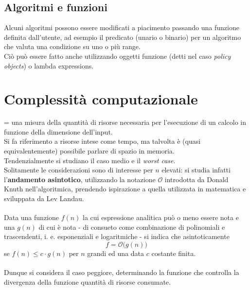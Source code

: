 \documentclass[10pt, oneside]{book}
\begin{document}
\subsection{Algoritmi e funzioni}
Alcuni algoritmi possono essere modificati a piacimento passando una funzione definita dall'utente, ad esempio il predicato (unario o binario) per un algoritmo che valuta una condizione su uno o più range.\\
Ciò può essere fatto anche utilizzando oggetti funzione (detti nel caso \textit{policy objects}) o lambda expressions.

\section{Complessità computazionale}
= una misura della quantità di risorse necessaria per l'esecuzione di un calcolo in funzione della dimensione dell'input.\\
Si fa riferimento a risorse intese come tempo, ma talvolta è (quasi equivalentemente) possibile parlare di spazio in memoria.\\
Tendenzialmente si studiano il caso medio e il \textit{worst case}.\\
Solitamente le considerazioni sono di interesse per $n$ elevati: si studia infatti l'\textbf{andamento asintotico}, utilizzando la notazione $\mathcal{O}$ introdotta da Donald Knuth nell'algoritmica, prendendo ispirazione a quella utilizzata in matematica e sviluppata da Lev Landau.\\~\\
Data una funzione $f(n)$ la cui espressione analitica può o meno essere nota e una $g(n)$ di cui è nota - di consueto come combinazione di polinomiali e trascendenti, i. e. esponenziali e logaritmiche - si indica che asintoticamente 
\[f = \mathcal{O}\big(g(n)\big)\]
se $f(n) \leq c \cdot g(n)$ per $n$ grandi ed una data $c$ costante finita.\\~\\
Dunque si considera il caso peggiore, determinando la funzione che controlla la divergenza della funzione quantità di risorse consumate.
\end{document}
